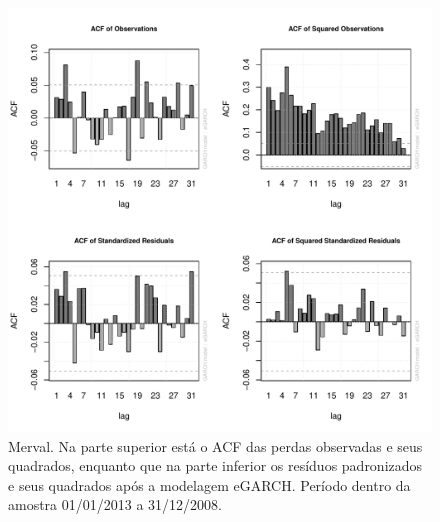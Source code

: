 \documentclass[1p]{elsarticle}
\theoremstyle{definition}
\begin{document}
\begin{figure}[H]
	\centering
	\includegraphics[width=1\linewidth]{figs/artigo-acf-Merval}
	\caption{Merval. Na parte superior está o ACF das perdas observadas e seus quadrados, enquanto que na parte inferior os resíduos padronizados e seus quadrados após a modelagem eGARCH. Período dentro da amostra 01/01/2013 a 31/12/2008.}
	\label{fig:artigo-acf-merval}
\end{figure}
\end{document}
